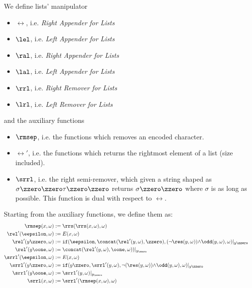\begin{conditional}{\notappendix}
  \begin{defn}
    \label{def:listops}
      We define lists' manipulator
      \begin{itemize}
        \item $\rel$, i.e. \emph{Right Appender for Lists}
        \item $\lel$, i.e. \emph{Left Appender for Lists}
        \item $\ral$, i.e. \emph{Right Appender for Lists}
        \item $\lal$, i.e. \emph{Left Appender for Lists}
        \item $\rrl$, i.e. \emph{Right Remover for Lists}
        \item $\lrl$, i.e. \emph{Left Remover for Lists}
      \end{itemize}
      and the auxiliary functions
      \begin{itemize}
        \item $\rmsep$, i.e. the functions which removes an encoded character.
        \item $\rel'$, i.e. the functions which returns the rightmost element
        of a list (size included).
        \item $\srrl$, i.e. the right semi-remover, which given a
        string shaped as $\sigma\zzero\zzero\tau\zzero\zzero$ returns
        $\sigma\zzero\zzero$ where $\sigma$ is as long as possible.
        This function is dual with respect to $\rel$.
      \end{itemize}
      Starting from the auxiliary functions, we define them as:
      \begin{align*}
        \rmsep(x, \omega) &:= \rrs(\rrs(x, \omega), \omega)\\
        \rel'(\eepsilon,\omega) &:= E(x, \omega) \\
        \rel'(y\zzero, \omega) &:= \mathtt{if}(\eepsilon,
        \concat(\rel'(y,\omega),\zzero),
        (\lnot \res(y, \omega)){\wedge}
        \odd(y, \omega),\omega)|_{y\zzero} \\
        \rel'(y\oone,\omega) &:=
        \concat(\rel'(y,\omega),
        \oone,\omega))|_{y_\zzero}\\
        \srrl'(\eepsilon,\omega) &:= E(x, \omega)\\
        \srrl'(y\zzero, \omega) &:= \mathtt{if}(y\zzero,
        \srrl'(y, \omega),
        \lnot (\res(y, \omega)){\wedge}
        \odd(y, \omega),\omega)|_{y\zzero} \\
        \srrl'(y\oone,\omega) &:= \srrl'(y, \omega)|_{y_\zzero}\\
        \srrl(x, \omega) &:= \srrl'(\rmsep(x, \omega), \omega)\\
      \end{align*}


\end{defn}
\end{conditional}
